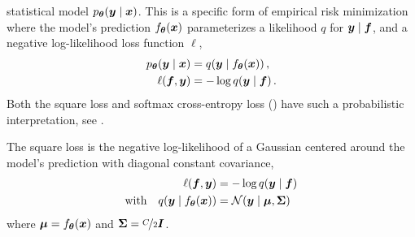 statistical model $p_{{\bm{\theta}}}({\bm{y}}\;|\;{\bm{x}})$. This is a specific form
of empirical risk minimization where the model's prediction $f_{{\bm{\theta}}}({\bm{x}})$
parameterizes a likelihood $q$ for ${\bm{y}}\;|\;{\bm{f}}$, and a negative
log-likelihood loss function $\ell$, \ie
\begin{subequations}
  \label{eq:background::connectionsMLEandEmpiricalRiskMinimization}
  \begin{align}
    p_{{\bm{\theta}}}({\bm{y}}\;|\;{\bm{x}}) &= q({\bm{y}}\;|\;f_{{\bm{\theta}}}({\bm{x}}))\,,
    \\
    \ell({\bm{f}}, {\bm{y}}) &= - \log q({\bm{y}}\;|\;{\bm{f}})\,.
  \end{align}
\end{subequations}
Both the square loss and softmax cross-entropy loss
() have such a
probabilistic interpretation, see
.

\begin{example}\label{ex:background::probabilisticInterpretationMSELoss} The square
  loss  is the negative log-likelihood of a
  Gaussian centered around the model's prediction with diagonal constant
  covariance,
  \begin{align*}
    \ell({\bm{f}}, {\bm{y}}) &= -\log q({\bm{y}}\;|\;{\bm{f}})
    \\
    \text{with}\quad
    q({\bm{y}}\;|\;f_{{\bm{\theta}}}({\bm{x}})) &= {\mathcal{N}}({\bm{y}}\;|\;{\bm{\mu}}, {\bm{\Sigma}})
  \end{align*}
  where%
  ${\bm{\mu}} = f_{{\bm{\theta}}}({\bm{x}})$ and ${\bm{\Sigma}} = \nicefrac{C}{2} {\bm{I}}$.
\end{example}

